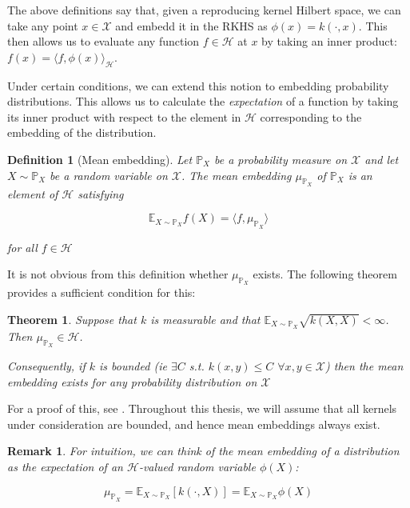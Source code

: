 \documentclass[12pt]{article}
\newtheorem*{remark}{Remark}
\newtheorem{definition}{Definition}
\newtheorem{theorem}{Theorem}
\numberwithin{claim}{section}
\numberwithin{lemma}{section}
\numberwithin{theorem}{section}
\begin{document}
The above definitions say that, given a reproducing kernel Hilbert space, we can take any point $x \in \mathcal{X}$ and embedd it in the RKHS as $\phi(x) = k(\cdot,x)$. This then allows us to evaluate any function $f \in \mathcal{H}$ at $x$ by taking an inner product: $f(x) = \langle f, \phi(x) \rangle_\mathcal{H}$.

Under certain conditions, we can extend this notion to embedding probability distributions. This allows us to calculate the \emph{expectation} of a function by taking its inner product with respect to the element in $\mathcal{H}$ corresponding to the embedding of the distribution. 

\begin{definition}[Mean embedding]
Let $\mathbb{P}_X$ be a probability measure on $\mathcal{X}$ and let $X \sim \mathbb{P}_X$ be a random variable on $\mathcal{X}$. The \emph{mean embedding} $\mu_{\mathbb{P}_X}$ of $\mathbb{P}_X$ is an element of $\mathcal{H}$ satisfying

\[\mathbb{E}_{X\sim \mathbb{P}_X} f(X) = \langle f, \mu_{\mathbb{P}_X} \rangle \]

for all $f \in \mathcal{H}$


\end{definition}

It is not obvious from this definition whether $\mu_{\mathbb{P}_X}$ exists. The following theorem provides a sufficient condition for this:

\begin{theorem}

Suppose that $k$ is measurable and that $\mathbb{E}_{X \sim \mathbb{P}_X} \sqrt{k(X,X)} < \infty$. Then $\mu_{\mathbb{P}_X} \in \mathcal{H}$.

Consequently, if $k$ is \emph{bounded} (ie $\exists C$ s.t.  $k(x,y) \leq C$ $\forall x,y \in \mathcal{X}$) then the mean embedding exists for any probability distribution on $\mathcal{X}$
\end{theorem}

For a proof of this, see \cite{sriperumbudur2010hilbert}. Throughout this thesis, we will assume that all kernels under consideration are bounded, and hence mean embeddings always exist.

\begin{remark}
For intuition, we can think of the mean embedding of a distribution as the expectation of an $\mathcal{H}$-valued random variable $\phi(X)$:

\[ \mu_{\mathbb{P}_X} = \mathbb{E}_{X\sim \mathbb{P}_X}[k(\cdot,X)] = \mathbb{E}_{X\sim \mathbb{P}_X}\phi(X)\]

\end{remark}
\end{document}
